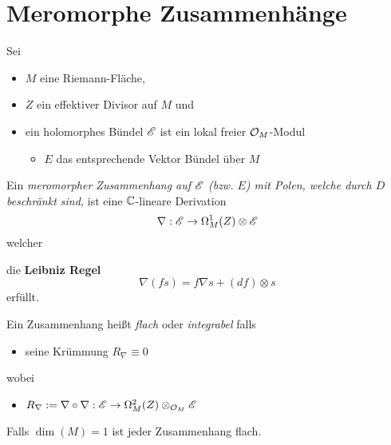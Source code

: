 \section{Meromorphe Zusammenhänge} %
Sei
\begin{itemize}
  \item $M$ eine Riemann-Fläche\marginnote{$\C$},
  \item $Z$ ein effektiver Divisor auf $M$ und
  \item ein holomorphes Bündel $\mathscr{E}$ ist ein lokal freier $\mathcal{O}_M$-Modul
    \begin{itemize}
      \item $E$ das entsprechende Vektor Bündel über $M$
    \end{itemize}
\end{itemize}
\begin{comment}
  \begin{itemize}
    \item ein meromorphes Bündel $\sM$ ist ein lokal freier $\cO_M(*Z)$-Modul
  \end{itemize}
\end{comment}
\begin{defn}
  Ein \emph{meromorpher Zusammenhang auf $\mathscr{E}$ (bzw. $E$) mit Polen, welche
  durch $D$ beschränkt sind,} ist eine $\C$-lineare Derivation
  \[
    \nabla:\mathscr{E}\to\Omega_M^1(Z)\otimes\mathscr{E}
  \]
  welcher
  \begin{comment}
    \begin{itemize}
      \item für
        \begin{itemize}
          \item alle offenen Mengen $U\subset M$,
          \item alle Schnitte $s\in\Gamma(U,\sE)$ und
          \item alle holomorphen Funktionen $f\in\cO(U)$
        \end{itemize}
    \end{itemize}
  \end{comment}
  die \textbf{Leibniz Regel}
  \[
    \nabla(fs)=f\nabla s+(df)\otimes s
  \]
  erfüllt.

  \begin{defn}
    Ein Zusammenhang heißt \emph{flach} oder \emph{integrabel} falls
    \begin{itemize}
      \item seine Krümmung $R_\nabla\equiv0$
    \end{itemize}
    wobei
    \begin{itemize}
      \item $R_\nabla
        :=\nabla\circ\nabla:\mathscr{E}\to\Omega_M^2(Z)\otimes_{\mathcal{O}_M}\mathscr{E}$
    \end{itemize}
    \begin{rem}
      Falls $\dim(M)=1$ ist jeder Zusammenhang flach.
    \end{rem}
  \end{defn}
\end{defn}
